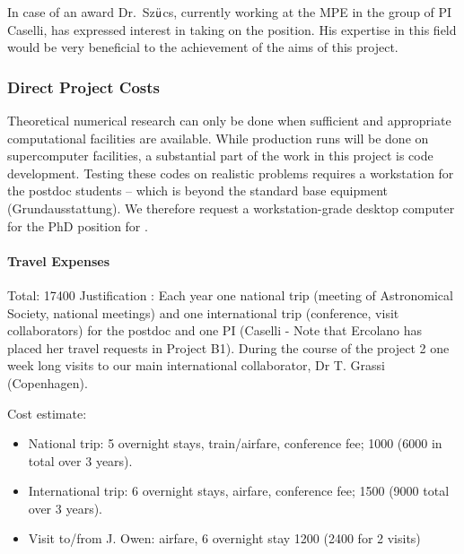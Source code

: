 \documentclass[10pt,fleqn,twoside]{article}
\begin{document}
In case of an award Dr.\ Sz$\ddot{\textsf u}$cs, currently working at
the MPE in the group of PI Caselli, has expressed interest in taking on the position. His expertise in this field would be very beneficial to the achievement of the aims of this project.

\subsubsection{Direct Project Costs}



Theoretical numerical research can only be done when sufficient and
appropriate computational facilities are available. While production
runs will be done on supercomputer facilities, a substantial part of
the work in this project is code development. Testing these codes on
realistic problems requires a workstation for the postdoc
students -- which is beyond the standard base equipment
(Grundausstattung). We therefore request a workstation-grade desktop
computer for the PhD position for .

\paragraph{Travel Expenses}

Total: 17400 \EUR{} Justification : 
Each year one national trip (meeting of Astronomical Society, national
meetings) and one international trip (conference, visit
collaborators) for the postdoc and one PI (Caselli - Note that Ercolano has
placed her travel requests in Project B1). 
During the course of the project 2 one week long visits to our main
international collaborator, Dr T. Grassi (Copenhagen). 

Cost estimate: 
\begin{itemize}
\item National trip: 5 overnight stays, train/airfare,
conference fee; 1000 \EUR{} (6000 in total over 3 years).
\item International trip: 6 overnight stays, airfare, conference fee;
  1500 \EUR{} (9000 total over 3 years).
\item Visit to/from J. Owen: airfare, 6 overnight stay 1200 \EUR{} (2400
  for 2 visits)
\end{itemize}


\end{document}
